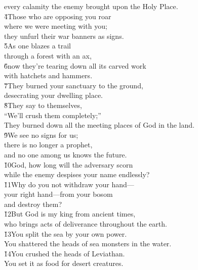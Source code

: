 \begin{poetry}
\poemll    every calamity the enemy brought upon the Holy Place. \\
\poeml \v{4}Those who are opposing you roar \\
\poemll    where we were meeting with you; \\
\poemlll       they unfurl their war banners as signs. \\
\poeml \v{5}As one blazes a trail \\
\poemll    through a forest with an ax, \\
\poeml \v{6}now they're tearing down all its carved work \\
\poemll    with hatchets and hammers. \\
\poeml \v{7}They burned your sanctuary to the ground, \\
\poemll    desecrating your dwelling place. \\
\poeml \v{8}They say to themselves, \\
\poemll    ``We'll crush them completely;'' \\
\poemlll       They burned down all the meeting places of God in the land. \\
\poeml \v{9}We see no signs for us; \\
\poemll    there is no longer a prophet, \\
\poemlll       and no one among us knows the future. \\
\poeml \v{10}God, how long will the adversary scorn \\
\poemll    while the enemy despises your name endlessly? \\
\poeml \v{11}Why do you not withdraw your hand--- \\
\poemll    your right hand---from your bosom \\
\poemlll       and destroy them? \\
\poeml \v{12}But God is my king from ancient times, \\
\poemll    who brings acts of deliverance throughout the earth. \\
\poeml \v{13}You split the sea by your own power. \\
\poemll    You shattered the heads of sea monsters in the water. \\
\poeml \v{14}You crushed the heads of Leviathan. \\
\poemll    You set it as food for desert creatures. \\

\end{poetry}
